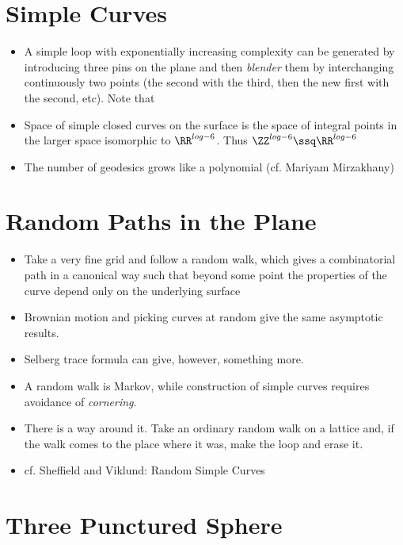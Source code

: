\documentclass[11pt]{scrartcl}
\begin{document}
\section{Simple Curves}

\begin{itemize}
\item Α simple loop with exponentially increasing complexity can be
  generated by introducing three pins on the plane and then
  \textit{blender} them by interchanging continuously two points (the
  second with the third, then the new first with the second, etc). Note that
\item Space of simple closed curves on the surface is the space of
  integral points in the larger space isomorphic to $\RR ^{log -
    6}$. Thus $\ZZ^{log -6} \ssq \RR ^{log -6}$

\item The number of geodesics grows like a polynomial (cf. Mariyam Mirzakhany)
\end{itemize}

\section{Random Paths in the Plane}

\begin{itemize}
\item Take a very fine grid and follow a random walk, which gives a
  combinatorial path in a canonical way such that beyond some point
  the properties of the curve depend only on the underlying surface
\item Brownian motion and picking curves at random give the same
  asymptotic results.
\item Selberg trace formula can give, however, something more.
\item A random walk is Markov, while construction of simple curves
  requires avoidance of \textit{cornering}.
\item There is a way around it. Take an ordinary random walk on a lattice and, if the walk comes
  to the place where it was, make the loop and erase it.
\item cf. Sheffield and Viklund: Random Simple Curves

\end{itemize}

\section{Three Punctured Sphere}
\end{document}
